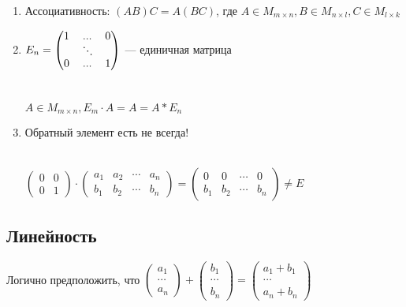 \begin{enumerate}
    \item Ассоциативность: $(AB)C = A(BC)$, где $A \in M_{m \times n}, B \in M_{n \times l}, C \in M_{l \times k} $\\
    \item $E_n = \begin{pmatrix}
        1 & ... &0\\
        &\rotatebox{135}{$\cdots$}&\\
        0&...&1 
    \end{pmatrix}$ --- единичная матрица \\\\\\
    $A \in M_{m\times n}, E_m \cdot A = A = A * E_n$
    \item Обратный элемент есть не всегда!\\\\
    \begin{example}
        $\begin{pmatrix}
            0&0\\
            0&1
        \end{pmatrix} \cdot 
        \begin{pmatrix} 
            a_1& a_2 & \cdots & a_n \\
            b_1& b_2 & \cdots & b_n 
        \end{pmatrix} = \begin{pmatrix}
            0&0&\cdots&0 \\
            b_1 & b_2 & \cdots & b_n 
        \end{pmatrix} \not = E$
    \end{example}
\end{enumerate}

\newpage
\subsection{Линейность}

\begin{remark}
    Логично предположить, что $\begin{pmatrix}
        a_1\\
        \cdots\\
        a_n
    \end{pmatrix} + \begin{pmatrix}
        b_1\\
        \cdots\\
        b_n
    \end{pmatrix} = \begin{pmatrix}
        a_1 + b_1\\
        \cdots\\
        a_n + b_n
    \end{pmatrix}$
\end{remark}

